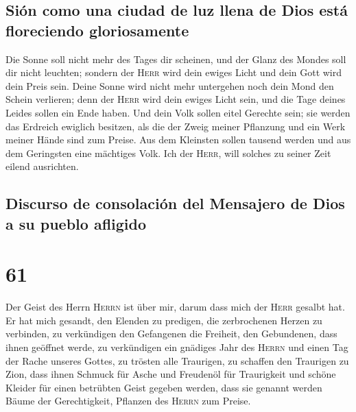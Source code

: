 \hypertarget{siuxf3n-como-una-ciudad-de-luz-llena-de-dios-estuxe1-floreciendo-gloriosamente}{%
\subsection{Sión como una ciudad de luz llena de Dios está floreciendo
gloriosamente}\label{siuxf3n-como-una-ciudad-de-luz-llena-de-dios-estuxe1-floreciendo-gloriosamente}}

 Die Sonne soll nicht mehr des Tages dir scheinen, und
der Glanz des Mondes soll dir nicht leuchten; sondern der \textsc{Herr}
wird dein ewiges Licht und dein Gott wird dein Preis sein.
 Deine Sonne wird nicht mehr untergehen noch dein Mond
den Schein verlieren; denn der \textsc{Herr} wird dein ewiges Licht
sein, und die Tage deines Leides sollen ein Ende haben. 
Und dein Volk sollen eitel Gerechte sein; sie werden das Erdreich
ewiglich besitzen, als die der Zweig meiner Pflanzung und ein Werk
meiner Hände sind zum Preise.  Aus dem Kleinsten sollen
tausend werden und aus dem Geringsten eine mächtiges Volk. Ich der
\textsc{Herr}, will solches zu seiner Zeit eilend ausrichten.

\hypertarget{discurso-de-consolaciuxf3n-del-mensajero-de-dios-a-su-pueblo-afligido}{%
\subsection{Discurso de consolación del Mensajero de Dios a su pueblo
afligido}\label{discurso-de-consolaciuxf3n-del-mensajero-de-dios-a-su-pueblo-afligido}}

\hypertarget{section-60}{%
\section{61}\label{section-60}}

 Der Geist des Herrn \textsc{Herrn} ist über mir, darum
dass mich der \textsc{Herr} gesalbt hat. Er hat mich gesandt, den
Elenden zu predigen, die zerbrochenen Herzen zu verbinden, zu
verkündigen den Gefangenen die Freiheit, den Gebundenen, dass ihnen
geöffnet werde,  zu verkündigen ein gnädiges Jahr des
\textsc{Herrn} und einen Tag der Rache unseres Gottes, zu trösten alle
Traurigen,  zu schaffen den Traurigen zu Zion, dass ihnen
Schmuck für Asche und Freudenöl für Traurigkeit und schöne Kleider für
einen betrübten Geist gegeben werden, dass sie genannt werden Bäume der
Gerechtigkeit, Pflanzen des \textsc{Herrn} zum Preise.

